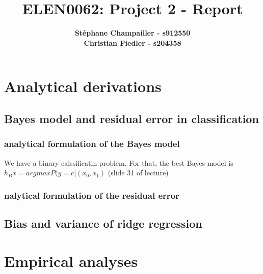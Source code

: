 \documentclass{article}
\begin{document}

\title{\Large{ELEN0062: Project 2 - Report}}
\vspace{1cm}
\author{\small{\bf Stéphane Champailler - s912550 } \\ \small{\bf Christian Fiedler - s204358}}



\maketitle


\def\picwidth{8cm}

\section{Analytical derivations}
\subsection{Bayes model and residual error in classification}
\subsubsection{analytical formulation of the Bayes model}


We have a binary calssificatin problem.
For that, the best Bayes model is  $h_B{x} = argmax P(y = c | (x_0,x_1) $ (slide 31 of lecture)






\subsubsection{nalytical formulation of the residual error}

\subsection{Bias and variance of ridge regression}

\section{Empirical analyses}
\end{document}
